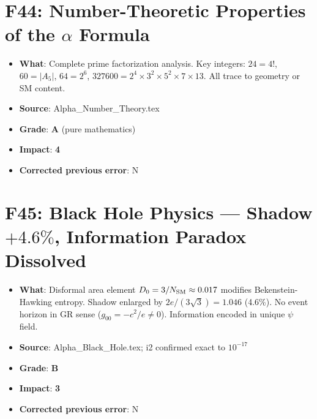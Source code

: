 \documentclass[11pt,a4paper]{article}
\newcommand{\grade}[1]{\textbf{#1}}
\newcommand{\impact}[1]{\textbf{#1}}
\begin{document}
\section{F44: Number-Theoretic Properties of the $\alpha$ Formula}
\begin{itemize}[nosep]
\item \textbf{What}: Complete prime factorization analysis. Key integers: $24 = 4!$, $60 = |A_5|$, $64 = 2^6$, $327600 = 2^4 \times 3^2 \times 5^2 \times 7 \times 13$. All trace to geometry or SM content.
\item \textbf{Source}: Alpha\_Number\_Theory.tex
\item \textbf{Grade}: \grade{A} (pure mathematics)
\item \textbf{Impact}: \impact{4}
\item \textbf{Corrected previous error}: N
\end{itemize}

\section{F45: Black Hole Physics --- Shadow $+4.6\%$, Information Paradox Dissolved}
\begin{itemize}[nosep]
\item \textbf{What}: Disformal area element $D_0 = 3/N_{\rm SM} \approx 0.017$ modifies Bekenstein-Hawking entropy. Shadow enlarged by $2e/(3\sqrt{3}) = 1.046$ (4.6\%). No event horizon in GR sense ($g_{00} = -c^2/e \neq 0$). Information encoded in unique $\psi$ field.
\item \textbf{Source}: Alpha\_Black\_Hole.tex; i2 confirmed exact to $10^{-17}$
\item \textbf{Grade}: \grade{B}
\item \textbf{Impact}: \impact{3}
\item \textbf{Corrected previous error}: N
\end{itemize}

\end{document}
